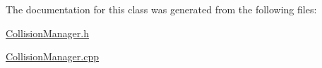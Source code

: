 The documentation for this class was generated from the following files\+:\begin{DoxyCompactItemize}
\item 
\hyperlink{_collision_manager_8h}{Collision\+Manager.\+h}\item 
\hyperlink{_collision_manager_8cpp}{Collision\+Manager.\+cpp}\end{DoxyCompactItemize}
